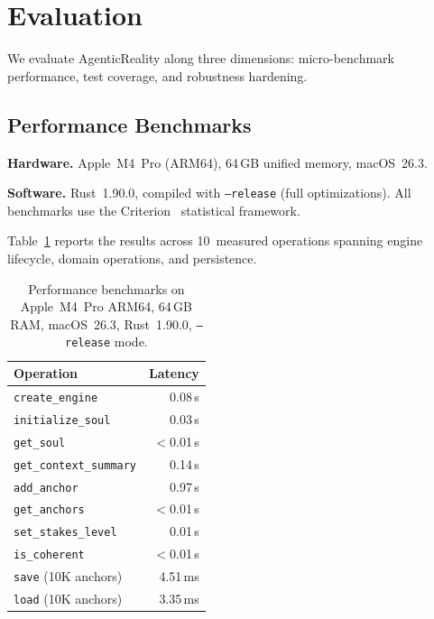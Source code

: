 \documentclass[10pt, twocolumn]{article}
\begin{document}
\section{Evaluation}
\label{sec:evaluation}

We evaluate AgenticReality along three dimensions: micro-benchmark performance, test coverage, and robustness hardening.

\subsection{Performance Benchmarks}
\label{sec:benchmarks}

\textbf{Hardware.} Apple~M4~Pro (ARM64), 64\,GB unified memory, macOS~26.3.

\textbf{Software.} Rust~1.90.0, compiled with \texttt{--release} (full optimizations). All benchmarks use the Criterion~\cite{criterion} statistical framework.

Table~\ref{tab:benchmarks} reports the results across 10~measured operations spanning engine lifecycle, domain operations, and persistence.

\begin{table}[t]
\caption{Performance benchmarks on Apple~M4~Pro ARM64, 64\,GB RAM, macOS~26.3, Rust~1.90.0, \texttt{--release} mode.}
\label{tab:benchmarks}
\centering
\scriptsize
\begin{tabular}{@{}lr@{}}
\toprule
\textbf{Operation} & \textbf{Latency} \\
\midrule
\texttt{create\_engine} & 0.08\,\textmu{}s \\
\texttt{initialize\_soul} & 0.03\,\textmu{}s \\
\texttt{get\_soul} & $<$0.01\,\textmu{}s \\
\texttt{get\_context\_summary} & 0.14\,\textmu{}s \\
\texttt{add\_anchor} & 0.97\,\textmu{}s \\
\texttt{get\_anchors} & $<$0.01\,\textmu{}s \\
\texttt{set\_stakes\_level} & 0.01\,\textmu{}s \\
\texttt{is\_coherent} & $<$0.01\,\textmu{}s \\
\midrule
\texttt{save} (10K anchors) & 4.51\,ms \\
\texttt{load} (10K anchors) & 3.35\,ms \\
\bottomrule
\end{tabular}
\end{table}
\end{document}
